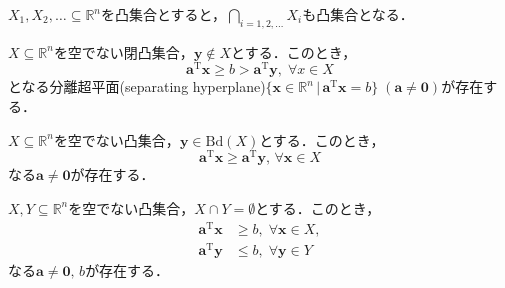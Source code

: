 \documentclass{jsreport}
\begin{document}
\begin{lemm}\label{lemm:convex}
  $X_1, X_2, \ldots \subseteq \mathbb{R}^n$を凸集合とすると，$\bigcap \limits_{i = 1, 2, \ldots} X_i$も凸集合となる．
\end{lemm}

\begin{lemm}\label{lemm:hyperplane1}
  $X \subseteq \mathbb{R}^n$を空でない閉凸集合，$\bm{y} \notin X$とする．このとき，
  \begin{equation}
    \bm{a}^{\mathrm{T}}\bm{x} \geq b > \bm{a}^{\mathrm{T}}\bm{y}, \; \forall x \in X \nonumber
  \end{equation}
  となる分離超平面(separating hyperplane)$\{\bm{x} \in \mathbb{R}^n \, | \, \bm{a}^{\mathrm{T}} \bm{x} = b\} \; (\bm{a} \neq \bm{0})$が存在する．
\end{lemm}


\begin{lemm}\label{lemm:hyperplane2}
  $X \subseteq \mathbb{R}^n$を空でない凸集合，$\bm{y} \in \mathrm{Bd}(X)$とする．このとき，
  \begin{equation}
    \bm{a}^{\mathrm{T}} \bm{x} \geq \bm{a}^{\mathrm{T}} \bm{y}, \, \forall \bm{x} \in X \nonumber
  \end{equation}
  なる$\bm{a} \neq \bm{0}$が存在する．
\end{lemm}

\begin{lemm}\label{lemm:hyperplane3}
  $X, Y \subseteq \mathbb{R}^n$を空でない凸集合，$X \cap Y = \emptyset$とする．このとき，
  \begin{align}\label{eq:hyperplane3}
    \bm{a}^{\mathrm{T}}\bm{x} &\geq b, \; \forall \bm{x} \in X, \nonumber \\
    \bm{a}^{\mathrm{T}}\bm{y} &\leq b, \; \forall \bm{y} \in Y
  \end{align}
  なる$\bm{a} \neq \bm{0}, \, b$が存在する．
\end{lemm}
\end{document}

